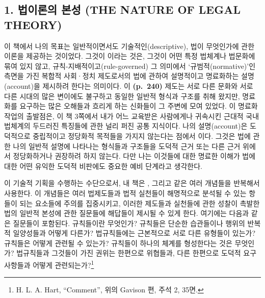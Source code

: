 \subsection{1. 법이론의 본성 (THE NATURE OF LEGAL
THEORY)}\label{uxbc95uxc774uxb860uxc758-uxbcf8uxc131-the-nature-of-legal-theory}

이 책에서 나의 목표는 일반적이면서도 기술적인(descriptive), 법이
무엇인가에 관한 이론을 제공하는 것이었다. 그것이 이라는
것은, 그것이 어떤 특정 법체계나 법문화에 묶여 있지 않고,
규칙-지배적이고(rule-governed) 그 의미에서 ‘규범적(normative)’인 측면을
가진 복합적 사회·정치 제도로서의 법에 관하여 설명적이고 명료화하는
설명(account)을 제시하려 한다는 의미이다. 이 \textbf{(p.~240)} 제도는
서로 다른 문화와 서로 다른 시대의 많은 변이에도 불구하고 동일한 일반적
형식과 구조를 취해 왔지만, 명료화를 요구하는 많은 오해들과 흐리게 하는
신화들이 그 주변에 모여 있었다. 이 명료화 작업의 출발점은, 이 책 3쪽에서
내가 어느 교육받은 사람에게나 귀속시킨 근대적 국내법체계의 두드러진
특징들에 관한 널리 퍼진 공통 지식이다. 나의 설명(account)은 도덕적으로
중립적이고 정당화적 목적들을 가지지 않는다는 점에서 이다.
그것은 법에 관한 나의 일반적 설명에 나타나는 형식들과 구조들을 도덕적
근거 또는 다른 근거 위에서 정당화하거나 권장하려 하지 않는다. 다만 나는
이것들에 대한 명료한 이해가 법에 대한 어떤 유익한 도덕적 비판에도 중요한
예비 단계라고 생각한다.

이 기술적 기획을 수행하는 수단으로서, 내 책은 , 그리고  같은
여러 개념들을 반복해서 사용한다. 이 개념들은 여러 법제도들과 법적
실천들이 해명적으로 분석될 수 있는 항들이 되는 요소들에 주의를
집중시키고, 이러한 제도들과 실천들에 관한 성찰이 촉발한 법의 일반적
본성에 관한 질문들에 해답들이 제시될 수 있게 한다. 여기에는 다음과 같은
질문들이 포함된다. 규칙들이란 무엇인가? 규칙들은 단순한 습관들이나
행위의 반복적 일양성들과 어떻게 다른가? 법규칙들에는 근본적으로 서로
다른 유형들이 있는가? 규칙들은 어떻게 관련될 수 있는가? 규칙들이 하나의
체계를 형성한다는 것은 무엇인가? 법규칙들과 그것들이 가진 권위는
한편으로 위협들과, 다른 한편으로 도덕적 요구사항들과 어떻게
관련되는가?\footnote{H. L. A. Hart, “Comment”, 위의 Gavison 편, 주석
  2, 35면.}

